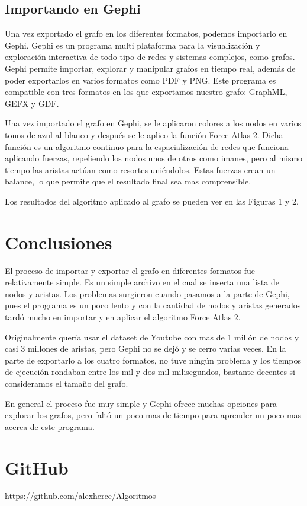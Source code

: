 \documentclass{sig-alternate-05-2015}
\begin{document}
\subsection{Importando en Gephi}
Una vez exportado el grafo en los diferentes formatos, podemos importarlo en Gephi. Gephi es un programa multi plataforma para la visualización y exploración interactiva de todo tipo de redes y sistemas complejos, como grafos. Gephi permite importar, explorar y manipular grafos en tiempo real, además de poder exportarlos en varios formatos como PDF y PNG. Este programa es compatible con tres formatos en los que exportamos nuestro grafo: GraphML, GEFX y GDF.

Una vez importado el grafo en Gephi, se le aplicaron colores a los nodos en varios tonos de azul al blanco y después se le aplico la función Force Atlas 2. Dicha función es un algoritmo continuo para la espacialización de redes que funciona aplicando fuerzas, repeliendo los nodos unos de otros como imanes, pero al mismo tiempo las aristas actúan como resortes uniéndolos. Estas fuerzas crean un balance, lo que permite que el resultado final sea mas comprensible.

Los resultados del algoritmo aplicado al grafo se pueden ver en las Figuras 1 y 2.


\section{Conclusiones}
El proceso de importar y exportar el grafo en diferentes formatos fue relativamente simple. Es un simple archivo en el cual se inserta una lista de nodos y aristas. Los problemas surgieron cuando pasamos a la parte de Gephi, pues el programa es un poco lento y con la cantidad de nodos y aristas generados tardó mucho en importar y en aplicar el algoritmo Force Atlas 2. 

Originalmente quería usar el dataset de Youtube con mas de 1 millón de nodos y casi 3 millones de aristas, pero Gephi no se dejó y se cerro varias veces. En la parte de exportarlo a los cuatro formatos, no tuve ningún problema y los tiempos de ejecución rondaban entre los mil y dos mil milisegundos, bastante decentes si consideramos el tamaño del grafo.

En general el proceso fue muy simple y Gephi ofrece muchas opciones para explorar los grafos, pero faltó un poco mas de tiempo para aprender un poco mas acerca de este programa.


\section{GitHub}
https://github.com/alexherce/Algoritmos
\end{document}
